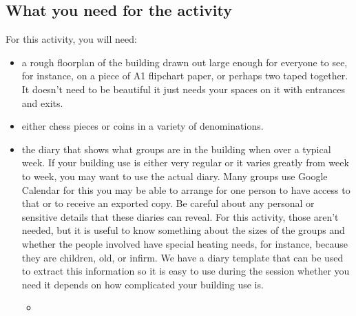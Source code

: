 \documentclass[letterpaper,10pt,english]{jupyterBook}
\begin{document}
\subsection{What you need for the activity}
\label{\detokenize{session3/details/activity:what-you-need-for-the-activity}}
\sphinxAtStartPar
For this activity, you will need:
\begin{itemize}
\item {} 
\sphinxAtStartPar
a rough floorplan of the building drawn out large enough for everyone to see, for instance, on a piece of A1 flipchart paper, or perhaps two taped together.   It doesn’t need to be beautiful \sphinxhyphen{} it just needs your spaces on it with entrances and exits.

\item {} 
\sphinxAtStartPar
either chess pieces or coins in a variety of denominations.

\item {} 
\sphinxAtStartPar
the diary that shows what groups are in the building when over a typical week.  If your building use is either very regular or it varies greatly from week to week, you may want to use the actual diary.  Many groups use Google Calendar for this \sphinxhyphen{} you may be able to arrange for one person to have access to that or to receive an exported copy.  Be careful about any personal or sensitive details that these diaries can reveal.  For this activity, those aren’t needed, but it is useful to know something about the sizes of the groups and whether the people involved have special heating needs, for instance, because they are children, old, or infirm.  We have a diary template that can be used to extract this information so it is easy to use during the session \sphinxhyphen{} whether you need it depends on how complicated your building use is.
\begin{itemize}
\item {} 
\sphinxAtStartPar
{}

\end{itemize}

\end{itemize}
\end{document}
